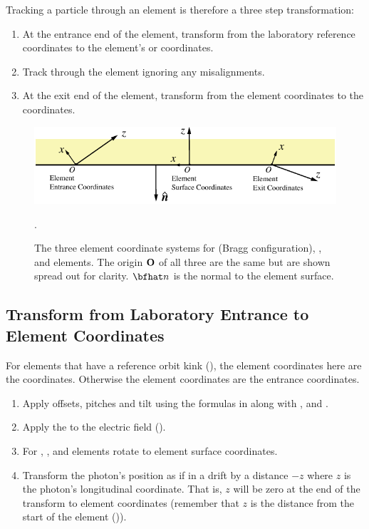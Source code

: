 Tracking a particle through an element is therefore a three
step transformation:
\begin{enumerate}[itemsep=-0.1ex, topsep=-0.4ex]
\item
At the entrance end of the element, transform from the laboratory
reference coordinates to the element's  or 
coordinates.
\item
Track through the element ignoring any misalignments.
\item
At the exit end of the element, transform from the element coordinates
to the   coordinates.
\end{enumerate}



\begin{figure}[tb]
  \centering
  \includegraphics[width=5in]{photon-ele-coords.pdf}
  \caption[Crystal, Mirror, and Multilayer_Mirror Element Coordinates.]
{The three element coordinate systems for  (Bragg
configuration), , and  elements.  The
origin ${\bf O}$ of all three are the same but are shown spread out for
clarity.  $\bfhat n$ is the normal to the element surface.}
  \label{f:photon.ele.coords}.
\end{figure}

\subsection{Transform from Laboratory Entrance to Element Coordinates}

For elements that have a reference orbit kink
(), the element coordinates here are the
 coordinates. Otherwise the element coordinates are
the entrance coordinates.

  \begin{enumerate}
  \item
Apply offsets, pitches and tilt using the formulas in
 along with , and .
  \item
Apply the  to the electric field ().
  \item
For , , and  elements
rotate to element surface coordinates.
 \item
Transform the photon's position as if in a drift by a distance $-z$
where $z$ is the photon's longitudinal coordinate. That is, $z$ will
be zero at the end of the transform to element coordinates (remember
that $z$ is the distance from the start of the element
()).

\end{enumerate}

